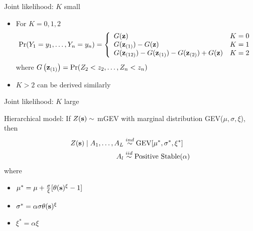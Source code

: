 \documentclass{beamer}
\begin{document}
\begin{frame}{Joint likelihood: $K$ small}
  \begin{itemize} \setlength{\itemsep}{1em}
    \item For $K = 0, 1, 2$
    {\scriptsize
    \begin{align*}
      \Pr(Y_1 = y_1, \ldots, Y_n = y_n) = \left\{ \begin{array}{ll}
        G(\mbox{\bf z})  & K = 0\\
        G(\mbox{\bf z}_{(1)}) - G(\mbox{\bf z}) & K = 1\\
        G(\mbox{\bf z}_{(12)}) - G(\mbox{\bf z}_{(1)}) - G(\mbox{\bf z}_{(2)}) + G(\mbox{\bf z}) & K =2
      \end{array}\right.
    \end{align*}
    }
    where $G\left(\mbox{\bf z}_{(1)}\right) = \Pr(Z_2 < z_2, \ldots, Z_n < z_n)$
    \item $K > 2$ can be derived similarly
  \end{itemize}
\end{frame}

\begin{frame}{Joint likelihood: $K$ large}
\begin{adjustwidth}{1em}{0em}
  Hierarchical model: If $Z(\mbox{\bf s}) \sim $ mGEV with marginal distribution GEV($\mu, \sigma, \xi$), then
  \begin{align*}
    Z(\mbox{\bf s}) \mid A_1, \ldots, A_L &\stackrel{ind}{\sim} \text{GEV}[\mu^*, \sigma^*, \xi^*] \\
    A_l &\stackrel{iid}{\sim} \text{Positive Stable}(\alpha)
  \end{align*}
  where
  \begin{itemize} \setlength{\itemsep}{0.25em}
    \item $\mu^* = \mu + \frac{ \sigma }{ \xi }[\theta(\mbox{\bf s})^\xi - 1]$
    \item $\sigma^* = \alpha \sigma \theta(\mbox{\bf s})^\xi$
    \item $\xi^* = \alpha \xi$
  \end{itemize}
\end{adjustwidth}
\end{frame}
\end{document}
